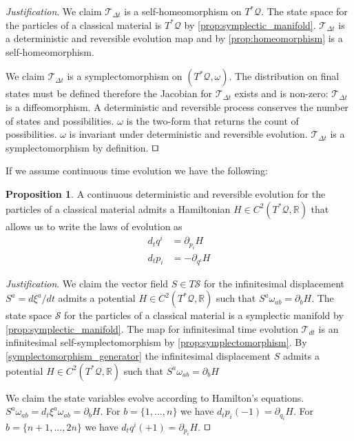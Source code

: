 \documentclass[smallextended]{svjour3}
\numberwithin{equation}{section}
\newenvironment{justification}{\emph{Justification}.}{\hfill\(\qed\)}
\theoremstyle{definition}
\newtheorem{prop}[equation]{Proposition}
\newenvironment{justification}{\emph{Justification}.}{\qed}
\begin{document}
\begin{justification}
	We claim $\mathcal{T}_{\Delta t}$ is a self-homeomorphism on $T^*\mathcal{Q}$. The state space for the particles of a classical material is $T^*\mathcal{Q}$ by \ref{prop:symplectic_manifold}. $\mathcal{T}_{\Delta t}$ is a deterministic and reversible evolution map and by \ref{prop:homeomorphism} is a self-homeomorphism.
	
	We claim $\mathcal{T}_{\Delta t}$ is a symplectomorphism on $(T^*\mathcal{Q}, \omega)$. The distribution on final states must be defined  therefore the Jacobian for $\mathcal{T}_{\Delta t}$ exists and is non-zero: $\mathcal{T}_{\Delta t}$ is a diffeomorphism. A deterministic and reversible process conserves the number of states and possibilities. $\omega$ is the two-form that returns the count of possibilities. $\omega$ is invariant under deterministic and reversible evolution. $\mathcal{T}_{\Delta t}$ is a symplectomorphism by definition.
\end{justification}

If we assume continuous time evolution we have the following:

\begin{prop}\label{prop:hamiltons_equations}
	A continuous deterministic and reversible evolution for the particles of a classical material admits a Hamiltonian $H \in C^2(T^*\mathcal{Q}, \mathbb{R})$ that allows us to write the laws of evolution as
\begin{align*}
d_{t}q^i &= \partial_{p_i} H \\
d_{t}p_i &= - \partial_{q^i} H
\end{align*}
\end{prop}

\begin{justification}
We claim the vector field $S \in T\mathcal{S}$ for the infinitesimal displacement $S^a = d\xi^a/dt$ admits a potential $H \in C^2(T^*\mathcal{Q}, \mathbb{R})$ such that $S^{a} \omega_{ab} = \partial_{b}H$. The state space $\mathcal{S}$ for the particles of a classical material is a symplectic manifold by \ref{prop:symplectic_manifold}. The map for infinitesimal time evolution $\mathcal{T}_{dt}$ is an infinitesimal self-symplectomorphism by \ref{prop:symplectomorphism}. By \ref{symplectomorphism_generator} the infinitesimal displacement $S$ admits a potential $H \in C^2(T^*\mathcal{Q}, \mathbb{R})$ such that $S^{a} \omega_{ab} = \partial_{b}H$

We claim the state variables evolve according to Hamilton's equations. $S^{a} \omega_{ab} = d_t\xi^a \omega_{ab} = \partial_{b}H$. For $b=\{1,...,n\}$ we have $d_tp_i (-1) = \partial_{q_i} H$. For $b=\{n+1,...,2n\}$ we have $d_tq^i (+1) = \partial_{p_i} H$.
\end{justification}
\end{document}
